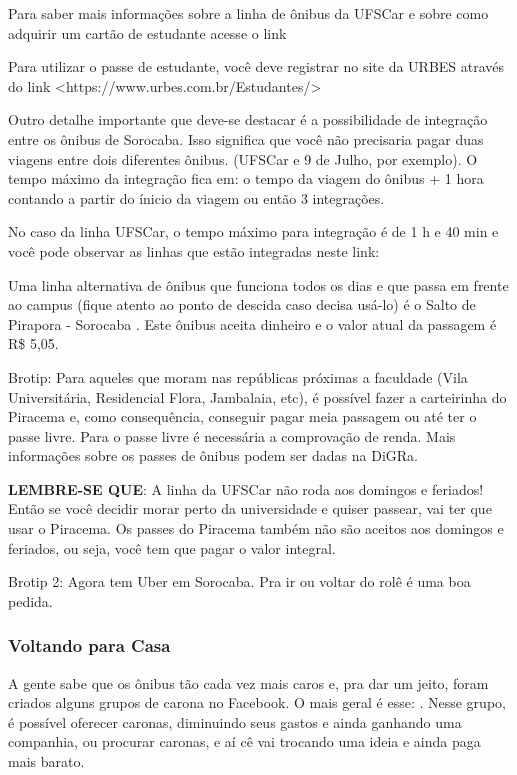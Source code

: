 Para saber mais informações sobre a linha de ônibus da UFSCar e sobre como adquirir um cartão de estudante acesse o link 

Para utilizar o passe de estudante, você deve registrar no site da URBES através do link <https://www.urbes.com.br/Estudantes/>

Outro detalhe importante que deve-se destacar é a possibilidade de integração entre os ônibus de Sorocaba. Isso significa que você não precisaria pagar duas viagens entre dois diferentes ônibus. (UFSCar e 9 de Julho, por exemplo). O tempo máximo da integração fica em: o tempo da viagem do ônibus + 1 hora contando a partir do ínicio da viagem ou então 3 integrações. 

No caso da linha UFSCar, o tempo máximo para integração é de 1 h e 40 min e você pode observar as linhas que estão integradas neste link: 

Uma linha alternativa de ônibus que funciona todos os dias e que passa em frente ao campus (fique atento ao ponto de descida caso decisa usá-lo) é o Salto de Pirapora - Sorocaba . Este ônibus aceita dinheiro e o valor atual da passagem é R\$ 5,05.

Brotip: Para aqueles que moram nas repúblicas próximas a faculdade (Vila Universitária, Residencial Flora, Jambalaia, etc), é possível fazer a carteirinha do Piracema e, como consequência, conseguir pagar meia passagem ou até ter o passe livre. Para o passe livre é necessária a comprovação de renda. Mais informações sobre os passes de ônibus podem ser dadas na DiGRa.

\textbf{LEMBRE-SE QUE}: A linha da UFSCar não roda aos domingos e feriados! Então se você decidir morar perto da universidade e quiser passear, vai ter que usar o Piracema. Os passes do Piracema também não são aceitos aos domingos e feriados, ou seja, você tem que pagar o valor integral.

Brotip 2: Agora tem Uber em Sorocaba. Pra ir ou voltar do rolê é uma boa pedida. 

\subsubsection{Voltando para Casa}
A gente sabe que os ônibus tão cada vez mais caros e, pra dar um jeito, foram
criados alguns grupos de carona no Facebook. O mais geral é esse:
. Nesse grupo, é possível oferecer caronas, diminuindo seus gastos e ainda ganhando uma companhia, ou procurar caronas, e aí cê vai trocando uma ideia e ainda paga mais barato.

